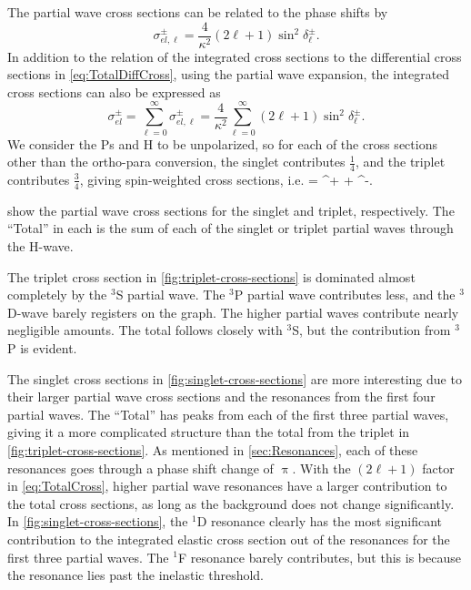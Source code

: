 \documentclass[Dissertation.tex]{subfiles}
\begin{document}
The partial wave cross sections can be 
related to the phase shifts by
\citep[p.584]{Bransden2003}
\begin{equation}
\label{eq:PartialCross}
\sigma_{el,\ell}^\pm = \frac{4}{\kappa^2} (2\ell+1) \sin^2 \delta_\ell^\pm.
\end{equation}
In addition to the relation of the integrated cross sections to the
differential cross sections in \cref{eq:TotalDiffCross},
using the partial wave expansion, the integrated cross sections can also be 
expressed as \citep[p.]{Bransden2003}
\begin{equation}
\label{eq:TotalCross}
\sigma_{el}^\pm = \sum_{\ell=0}^\infty \sigma_{el,\ell}^\pm = \frac{4}{\kappa^2} \sum_{\ell=0}^\infty (2\ell+1) \sin^2 \delta_\ell^\pm.
\end{equation}
We consider the Ps and H to be unpolarized, so
for each of the cross sections other than the ortho-para conversion, the 
singlet contributes $\frac{1}{4}$, and the triplet contributes $\frac{3}{4}$, 
giving spin-weighted cross sections, i.e. \cite{Ward1987,Blackwood2002}
\beq
\label{eq:SpinWeightCS}
\sigma =  \sigma^+ +  \sigma^-.
\eeq

 show the partial
wave cross sections for the singlet and triplet, respectively. The ``Total''
in each is the sum of each of the singlet or triplet partial waves through the
H-wave.

The triplet cross section in \cref{fig:triplet-cross-sections} is dominated 
almost completely by the $^3$S partial wave. The $^3$P partial wave 
contributes less, and the $^3$D-wave barely registers on the graph. The 
higher partial waves contribute nearly negligible amounts. The total follows
closely with $^3$S, but the contribution from $^3$P is evident.

The singlet cross sections in \cref{fig:singlet-cross-sections} are more
interesting due to their larger partial wave cross sections and the resonances
from the first four partial waves. The ``Total'' has peaks from each of the
first three partial waves, giving it a more complicated structure than the
total from the triplet in \cref{fig:triplet-cross-sections}. As mentioned
in \cref{sec:Resonances}, each of these resonances goes through a phase shift
change of $\uppi$. With the $(2\ell+1)$ factor in \cref{eq:TotalCross},
higher partial wave resonances have a larger contribution to the total
cross sections, as long as the background does not change significantly.
In \cref{fig:singlet-cross-sections}, the $^1$D resonance clearly has the
most significant contribution to the integrated elastic cross section out of
the resonances for the first three partial waves. The $^1$F resonance barely
contributes, but this is because the resonance lies past the inelastic 
threshold.
\end{document}
